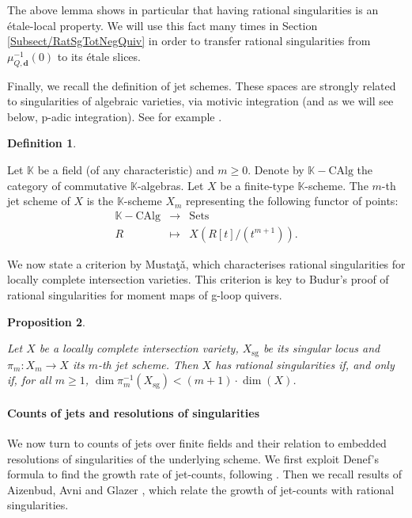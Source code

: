 \documentclass[11pt,english]{article}
\numberwithin{equation}{section}
\numberwithin{figure}{section}
\theoremstyle{definition}
\newtheorem{df}{Definition}[subsection]
\theoremstyle{plain}
\newtheorem{prop}[df]{Proposition}
\theoremstyle{remark}
\DeclareMathOperator{\sg}{sg}
\newcommand\dd{\mathbf{d}}
\newcommand\KK{\mathbb{K}}
\begin{document}
The above lemma shows in particular that having rational singularities
is an étale-local property. We will use this fact many times in Section
\ref{Subsect/RatSgTotNegQuiv} in order to transfer rational singularities
from $\mu_{Q,\dd}^{-1}(0)$ to its étale slices.

Finally, we recall the definition of jet schemes. These spaces are
strongly related to singularities of algebraic varieties, via motivic
integration (and as we will see below, p-adic integration). See for
example \cite{Mus01,Mus02,ELM04}.

\begin{df}{\cite[\S 3.2.]{CLNS18}}

Let $\KK$ be a field (of any characteristic) and $m\geq0$. Denote
by $\KK-\mathrm{CAlg}$ the category of commutative $\KK$-algebras.
Let $X$ be a finite-type $\KK$-scheme. The $m$-th jet scheme of
$X$ is the $\KK$-scheme $X_{m}$ representing the following functor
of points:\[
\begin{array}{rcl}
\KK-\mathrm{CAlg} & \rightarrow & \mathrm{Sets} \\
R & \mapsto & X(R[t]/(t^{m+1})).
\end{array}
\]

\end{df}

We now state a criterion by Musta\c{t}\v{a}, which characterises
rational singularities for locally complete intersection varieties.
This criterion is key to Budur's proof of rational singularities for
moment maps of g-loop quivers.

\begin{prop}{\cite[Thm. 0.1. \& Prop. 1.4.]{Mus01}} \label{Prop/MustCrit}

Let $X$ be a locally complete intersection variety, $X_{\sg}$ be
its singular locus and $\pi_{m}:X_{m}\rightarrow X$ its $m$-th jet
scheme. Then $X$ has rational singularities if, and only if, for
all $m\geq1$, $\dim\pi_{m}^{-1}(X_{\sg})<(m+1)\cdot\dim(X)$.

\end{prop}

\paragraph*{Counts of jets and resolutions of singularities}

We now turn to counts of jets over finite fields and their relation
to embedded resolutions of singularities of the underlying scheme.
We first exploit Denef's formula to find the growth rate of jet-counts,
following \cite{VZG08,Wys17b}. Then we recall results of Aizenbud,
Avni and Glazer \cite{AA18,Gla19}, which relate the growth of jet-counts
with rational singularities.
\end{document}
